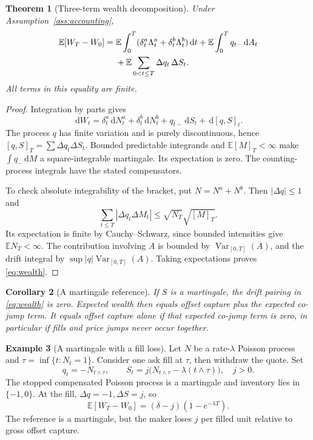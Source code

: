 \documentclass[11pt]{article}
\theoremstyle{plain}
\newtheorem{theorem}{Theorem}[section]
\newtheorem{corollary}[theorem]{Corollary}
\theoremstyle{definition}
\newtheorem{example}[theorem]{Example}
\theoremstyle{remark}
\newcommand{\E}{\mathbb E}
\newcommand{\dd}{\,\mathrm d}
\begin{document}
\begin{theorem}[Three-term wealth decomposition]\label{thm:accounting}
Under Assumption~\ref{ass:accounting},
\begin{align}
\E[W_T-W_0]
={}&\E\int_0^T(\delta^a_t\Lambda^a_t+\delta^b_t\Lambda^b_t)\dd t
 +\E\int_0^Tq_{t-}\dd A_t \notag\\
&+\E\sum_{0<t\le T}\Delta q_t\,\Delta S_t .\label{eq:wealth}
\end{align}
All terms in this equality are finite.
\end{theorem}
\begin{proof}
Integration by parts gives
\[
\dd W_t=\delta^a_t\dd N^a_t+\delta^b_t\dd N^b_t
       +q_{t-}\dd S_t+\dd[q,S]_t.
\]
The process \(q\) has finite variation and is purely discontinuous, hence
\([q,S]_T=\sum\Delta q_t\Delta S_t\).
Bounded predictable integrands and \(\E[M]_T<\infty\) make
\(\int q_-\dd M\) a square-integrable martingale. Its expectation is zero.
The counting-process integrals have the stated compensators.

To check absolute integrability of the bracket, put \(N=N^a+N^b\).
Then \(|\Delta q|\le1\) and
\[
\sum_{t\le T}|\Delta q_t\Delta M_t|
\le \sqrt{N_T}\sqrt{[M]_T}.
\]
Its expectation is finite by Cauchy--Schwarz, since bounded intensities
give \(\E N_T<\infty\). The contribution involving \(A\) is bounded by
\(\operatorname{Var}_{[0,T]}(A)\), and the drift integral by
\(\sup|q|\operatorname{Var}_{[0,T]}(A)\). Taking expectations proves
\eqref{eq:wealth}.
\end{proof}

\begin{corollary}[A martingale reference]\label{cor:martingale}
If \(S\) is a martingale, the drift pairing in \eqref{eq:wealth} is zero.
Expected wealth then equals offset capture plus the expected co-jump
term. It equals offset capture alone if that expected co-jump term is
zero, in particular if fills and price jumps never occur together.
\end{corollary}

\begin{example}[A martingale with a fill loss]\label{ex:martingale}
Let \(N\) be a rate-\(\lambda\) Poisson process and
\(\tau=\inf\{t:N_t=1\}\). Consider one ask fill at \(\tau\), then withdraw
the quote. Set
\[
q_t=-N_{t\wedge\tau},\qquad
S_t=j\big(N_{t\wedge\tau}-\lambda(t\wedge\tau)\big),\quad j>0.
\]
The stopped compensated Poisson process is a martingale and inventory
lies in \(\{-1,0\}\). At the fill, \(\Delta q=-1,\Delta S=j\), so
\[
\E[W_T-W_0]=(\delta-j)(1-e^{-\lambda T}).
\]
The reference is a martingale, but the maker loses \(j\) per filled unit
relative to gross offset capture.
\end{example}
\end{document}
